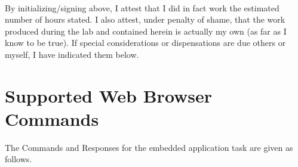 \documentclass[12pt]{article} %
\begin{document}
    ~\\

    By initializing/signing above, I attest that I did in fact work the
    estimated number of hours stated. I also attest, under penalty of shame,
    that the work produced during the lab and contained herein is actually my
    own (as far as I know to be true). If special considerations or
    dispensations are due others or myself, I have indicated them below.

    \pagebreak

		\section{Supported Web Browser Commands}

		The Commands and Responses for the embedded application task are given as follows. 
\end{document}
